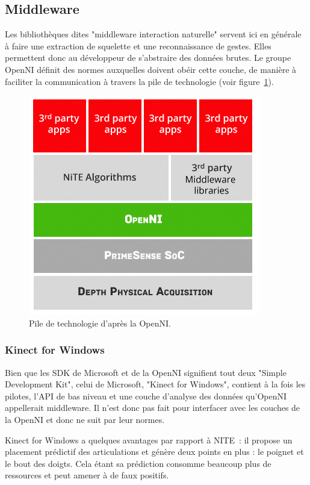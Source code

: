 
\subsection{Middleware}
Les bibliothèques dites "middleware interaction naturelle" servent ici en 
générale à faire une 
extraction de squelette et une reconnaissance de gestes. Elles permettent donc 
au développeur de s'abstraire des données brutes. Le groupe OpenNI définit 
des normes auxquelles doivent obéir cette couche, de 
manière à faciliter la communication à travers la pile de technologie (voir 
figure~\ref{fig:openni_technology_stack}).
\begin{figure}[h!]
\centering
\includegraphics[width=0.7\linewidth]{images/openni_technology_stack}
\caption{Pile de technologie d'après la OpenNI.}
\label{fig:openni_technology_stack}
\end{figure}


\subsubsection{Kinect for Windows}  
Bien que les SDK de Microsoft et de la OpenNI signifient tout deux 
"Simple Development Kit",
celui de Microsoft, "Kinect for Windows", contient à la fois les pilotes, 
l'API de bas niveau et une couche d'analyse des données qu'OpenNI appellerait 
middleware. Il n'est donc pas fait pour interfacer avec les couches de la 
OpenNI et donc ne suit par leur normes.

Kinect for Windows a quelques avantages par rapport à NITE~: il propose un
placement prédictif des articulations et génère deux points en plus :
le poignet et le bout des doigts. Cela étant sa prédiction consomme beaucoup 
plus de ressources et peut amener à de faux positifs\cite{microsoft_vs_openni}.

